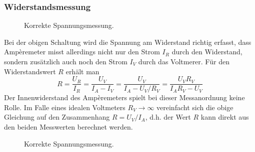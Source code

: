 \subsubsection{Widerstandsmessung}
\begin{figure}[H]
\centering
\caption{Korrekte Spannungsmessung.}
\label{fig_IIIu}
\end{figure}
Bei der obigen Schaltung wird die Spannung am Widerstand richtig erfasst, dass Ampèremeter misst allerdings nicht nur den Strom $I_R$ durch den Widerstand, sondern zusätzlich auch noch den Strom $I_V$ durch das Voltmerer. Für den Widerstandswert $R$ erhält man
\begin{equation}
\boxed{R=\dfrac{U_R}{I_R}=\dfrac{U_V}{I_A-I_V}=\dfrac{U_V}{I_A-U_V/R_V}=\dfrac{U_VR_V}{I_AR_V-U_V}}
\end{equation}
Der Innenwiderstand des Ampèremeters spielt bei dieser Messanordnung keine Rolle. Im Falle eines idealen Voltmeters $R_V\rightarrow \infty$ vereinfacht sich die obige Gleichung auf den Zusammenhang $R=U_V/I_A$, d.h. der Wert $R$ kann direkt aus den beiden Messwerten berechnet werden.
\begin{figure}[H]
\centering
\caption{Korrekte Spannungsmessung.}
\label{fig_IIIu}
\end{figure}
